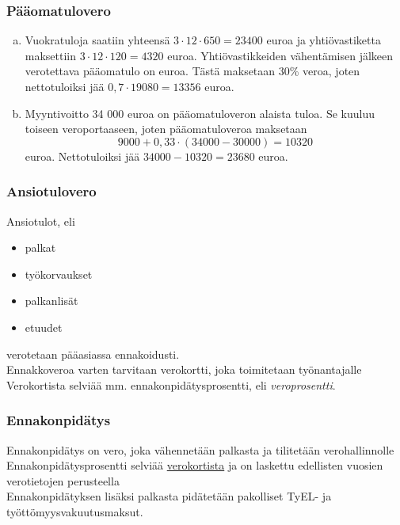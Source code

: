 \documentclass[]{beamer}\usepackage[]{graphicx}\usepackage[]{color}
\newcommand{\pblock}{\\ \vspace{0.5cm}\pause}
\begin{document}
\begin{frame}
\frametitle{Pääomatulovero}
	\begin{ratkaisu}
		\begin{enumerate}[(a)]
			\item Vuokratuloja saatiin yhteensä \pause \(3\cdot12\cdot650 = 23 400\) euroa ja yhtiövastiketta maksettiin \pause  \(3\cdot12\cdot120 = 4320\) euroa. \pause Yhtiövastikkeiden vähentämisen jälkeen verotettava pääomatulo on  euroa. Tästä maksetaan 30\% veroa, joten nettotuloiksi jää \pause \(0,7\cdot19080=13356\) euroa.\pause
			\item Myyntivoitto 34 000 euroa on pääomatuloveron alaista tuloa. \pause Se kuuluu toiseen veroportaaseen, joten pääomatuloveroa maksetaan\pause
			\[
				9000 + 0,33\cdot(34000-30000) = 10320
			\]
			euroa. \pause Nettotuloiksi jää \(34 000-10320 = 23680\) euroa.
		\end{enumerate}
		
	\end{ratkaisu}
\end{frame}

\begin{frame}
  \frametitle{Ansiotulovero}
  \pause
  Ansiotulot, eli
  \begin{itemize}
    \item palkat
    \item työkorvaukset
    \item palkanlisät
    \item etuudet
  \end{itemize}
  verotetaan pääasiassa ennakoidusti.
  \pblock
  Ennakkoveroa varten tarvitaan verokortti, joka toimitetaan työnantajalle
  \pblock 
  Verokortista selviää mm. ennakonpidätysprosentti, eli \emph{veroprosentti}.
\end{frame}

\begin{frame}
\frametitle{Ennakonpidätys}
\pause
Ennakonpidätys on vero, joka vähennetään palkasta ja tilitetään verohallinnolle
\pblock
Ennakonpidätysprosentti selviää \href{http://portal.vero.fi/Demo_VKV2015/Sivut/Login.aspx?demoasiakas=d1b73ac40dc9436a86f4b0683cd30d24&culture=fi-FI}{verokortista} ja on laskettu edellisten vuosien verotietojen perusteella
\pblock
Ennakonpidätyksen lisäksi palkasta pidätetään pakolliset TyEL- ja työttömyysvakuutusmaksut.
\end{frame}
\end{document}

